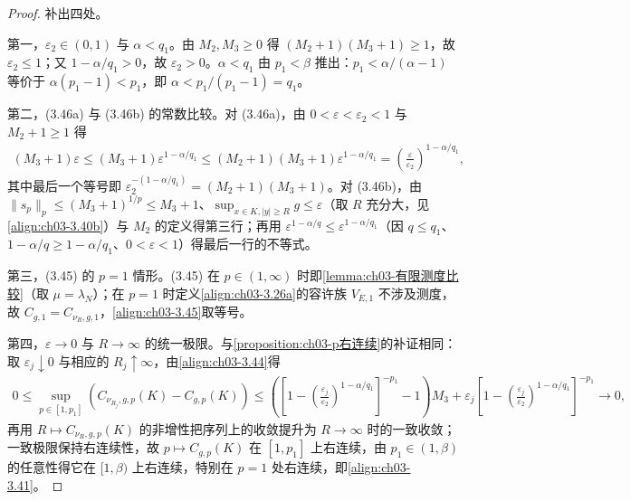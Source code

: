 \documentclass[../../main.tex]{subfiles}%
\begin{document}
\begin{proof}
补出四处。

第一，$\varepsilon_2\in(0,1)$ 与 $\alpha<q_1$。由 $M_2,M_3\geqslant0$ 得 $(M_2+1)(M_3+1)\geqslant1$，故 $\varepsilon_2\leqslant1$；又 $1-\alpha/q_1>0$，故 $\varepsilon_2>0$。$\alpha<q_1$ 由 $p_1<\beta$ 推出：$p_1<\alpha/(\alpha-1)$ 等价于 $\alpha(p_1-1)<p_1$，即 $\alpha<p_1/(p_1-1)=q_1$。

第二，(3.46a) 与 (3.46b) 的常数比较。对 (3.46a)，由 $0<\varepsilon<\varepsilon_2<1$ 与 $M_2+1\geqslant1$ 得
\begin{align*}
(M_3+1)\varepsilon\leqslant(M_3+1)\varepsilon^{1-\alpha/q_1}\leqslant(M_2+1)(M_3+1)\varepsilon^{1-\alpha/q_1}=\left(\frac{\varepsilon}{\varepsilon_2}\right)^{1-\alpha/q_1},
\end{align*}
其中最后一个等号即 $\varepsilon_2^{-(1-\alpha/q_1)}=(M_2+1)(M_3+1)$。对 (3.46b)，由 $\|s_p\|_p\leqslant(M_3+1)^{1/p}\leqslant M_3+1$、$\sup_{x\in K,|y|\geqslant R}g\leqslant\varepsilon$（取 $R$ 充分大，见\eqref{align:ch03-3.40b}）与 $M_2$ 的定义得第三行；再用 $\varepsilon^{1-\alpha/q}\leqslant\varepsilon^{1-\alpha/q_1}$（因 $q\leqslant q_1$、$1-\alpha/q\geqslant1-\alpha/q_1$、$0<\varepsilon<1$）得最后一行的不等式。

第三，(3.45) 的 $p=1$ 情形。(3.45) 在 $p\in(1,\infty)$ 时即\cref{lemma:ch03-有限测度比较}（取 $\mu=\lambda_N$）；在 $p=1$ 时定义\eqref{align:ch03-3.26a}的容许族 $V_{E,1}$ 不涉及测度，故 $C_{g,1}=C_{\nu_R,g,1}$，\eqref{align:ch03-3.45}取等号。

第四，$\varepsilon\to0$ 与 $R\to\infty$ 的统一极限。与\cref{proposition:ch03-p右连续}的补证相同：取 $\varepsilon_j\downarrow0$ 与相应的 $R_j\uparrow\infty$，由\eqref{align:ch03-3.44}得
\begin{align*}
0\leqslant\sup_{p\in[1,p_1]}\left(C_{\nu_{R_j},g,p}(K)-C_{g,p}(K)\right)
\leqslant\left(\left[1-\left(\frac{\varepsilon_j}{\varepsilon_2}\right)^{1-\alpha/q_1}\right]^{-p_1}-1\right)M_3
+\varepsilon_j\left[1-\left(\frac{\varepsilon_j}{\varepsilon_2}\right)^{1-\alpha/q_1}\right]^{-p_1}\to0,
\end{align*}
再用 $R\mapsto C_{\nu_R,g,p}(K)$ 的非增性把序列上的收敛提升为 $R\to\infty$ 时的一致收敛；一致极限保持右连续性，故 $p\mapsto C_{g,p}(K)$ 在 $[1,p_1]$ 上右连续，由 $p_1\in(1,\beta)$ 的任意性得它在 $[1,\beta)$ 上右连续，特别在 $p=1$ 处右连续，即\eqref{align:ch03-3.41}。
\end{proof}
\end{document}
